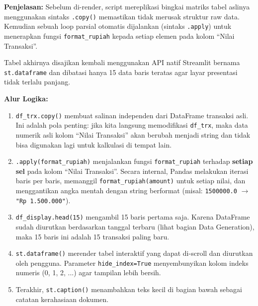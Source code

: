 \documentclass{article}
\begin{document}
\textbf{Penjelasan:}
Sebelum di-render, script mereplikasi bingkai matriks tabel aslinya menggunakan sintaks \texttt{.copy()} memastikan tidak merusak struktur raw data. Kemudian sebuah loop parsial otomatis dijalankan (sintaks \texttt{.apply}) untuk menerapkan fungsi \texttt{format\_rupiah} kepada setiap elemen pada kolom ``Nilai Transaksi''.

Tabel akhirnya disajikan kembali menggunakan API natif Streamlit bernama \texttt{st.dataframe} dan dibatasi hanya 15 data baris teratas agar layar presentasi tidak terlalu panjang.

\textbf{Alur Logika:}
\begin{enumerate}
	\item \texttt{df\_trx.copy()} membuat salinan independen dari DataFrame transaksi asli. Ini adalah pola penting: jika kita langsung memodifikasi \texttt{df\_trx}, maka data numerik asli kolom ``Nilai Transaksi'' akan berubah menjadi string dan tidak bisa digunakan lagi untuk kalkulasi di tempat lain.
	\item \texttt{.apply(format\_rupiah)} menjalankan fungsi \texttt{format\_rupiah} terhadap \textbf{setiap sel} pada kolom ``Nilai Transaksi''. Secara internal, Pandas melakukan iterasi baris per baris, memanggil \texttt{format\_rupiah(amount)} untuk setiap nilai, dan menggantikan angka mentah dengan string berformat (misal: \texttt{1500000.0} $\rightarrow$ \texttt{"Rp 1.500.000"}).
	\item \texttt{df\_display.head(15)} mengambil 15 baris pertama saja. Karena DataFrame sudah diurutkan berdasarkan tanggal terbaru (lihat bagian Data Generation), maka 15 baris ini adalah 15 transaksi paling baru.
	\item \texttt{st.dataframe()} merender tabel interaktif yang dapat di-scroll dan diurutkan oleh pengguna. Parameter \texttt{hide\_index=True} menyembunyikan kolom indeks numeris (0, 1, 2, ...) agar tampilan lebih bersih.
	\item Terakhir, \texttt{st.caption()} menambahkan teks kecil di bagian bawah sebagai catatan kerahasiaan dokumen.
\end{enumerate}
\end{document}
